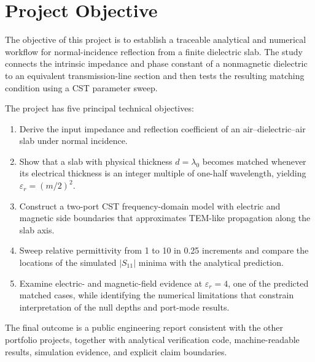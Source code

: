 \chapter*{Project Objective}
\thispagestyle{fancy}
\begingroup
\setlength{\emergencystretch}{2em}

The objective of this project is to establish a traceable analytical and numerical
workflow for normal-incidence reflection from a finite dielectric slab. The study
connects the intrinsic impedance and phase constant of a nonmagnetic dielectric to an
equivalent transmission-line section and then tests the resulting matching condition
using a CST parameter sweep.

The project has five principal technical objectives:

\begin{enumerate}
    \item Derive the input impedance and reflection coefficient of an
    air--dielectric--air slab under normal incidence.

    \item Show that a slab with physical thickness $d=\lambda_0$ becomes matched
    whenever its electrical thickness is an integer multiple of one-half wavelength,
    yielding $\varepsilon_r=(m/2)^2$.

    \item Construct a two-port CST frequency-domain model with electric and magnetic
    side boundaries that approximates TEM-like propagation along the slab axis.

    \item Sweep relative permittivity from 1 to 10 in 0.25 increments and compare the
    locations of the simulated $|S_{11}|$ minima with the analytical prediction.

    \item Examine electric- and magnetic-field evidence at $\varepsilon_r=4$, one of
    the predicted matched cases, while identifying the numerical limitations that
    constrain interpretation of the null depths and port-mode results.
\end{enumerate}

The final outcome is a public engineering report consistent with the other portfolio
projects, together with analytical verification code, machine-readable results,
simulation evidence, and explicit claim boundaries.

\endgroup
